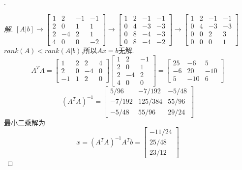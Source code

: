 \documentclass[10pt,a4paper]{report}
\begin{document}
.
\begin{proof}[解]
	$[A|b] \rightarrow \left[
	\begin{matrix}
	1 & 2 & -1 & -1\\
	2 & 0 & 1 & 1\\
	2 & -4 & 2 & 1\\
	4 & 0 & 0 & -2
	\end{matrix}
	\right] \rightarrow \left[
	\begin{matrix}
	1 & 2 & -1 & -1\\
	0 & 4 & -3 & -3\\
	0 & 8 & -4 & -3\\
	0 & 8 & -4 & -2
	\end{matrix}
	\right] \rightarrow \left[
	\begin{matrix}
	1 & 2 & -1 & -1\\
	0 & 4 & -3 & -3\\
	0 & 0 & 2 & 3\\
	0 & 0 & 0 & 1
	\end{matrix}
	\right]$\\
	$rank(A) < rank(A|b)$,所以$Ax=b$无解.\\
	$$A^{T}A = \left[
	\begin{matrix}
	1 & 2 & 2 & 4\\
	2 & 0 & -4 & 0\\
	-1 & 1 & 2 & 0
	\end{matrix}
	\right]\left[
	\begin{matrix}
	1 & 2 & -1\\
	2 & 0 & 1\\
	2 & -4 & 2\\
	4 & 0 & 0
	\end{matrix}
	\right] = \left[
	\begin{matrix}
	25 & -6 & 5\\
	-6 & 20 & -10\\
	5 & -10 & 6
	\end{matrix}
	\right]$$
	$$(A^{T}A)^{-1} = \left[
	\begin{matrix}
	5/96 & -7/192 & -5/48\\
	-7/192 & 125/384 & 55/96\\
	-5/48 & 55/96 & 29/24
	\end{matrix}
	\right]$$
	最小二乘解为\\
	$$x = (A^{T}A)^{-1}A^{T}b = \left[
	\begin{matrix}
	-11/24\\
	25/48\\
	23/12
	\end{matrix}
	\right]$$
\end{proof}
\end{document}
